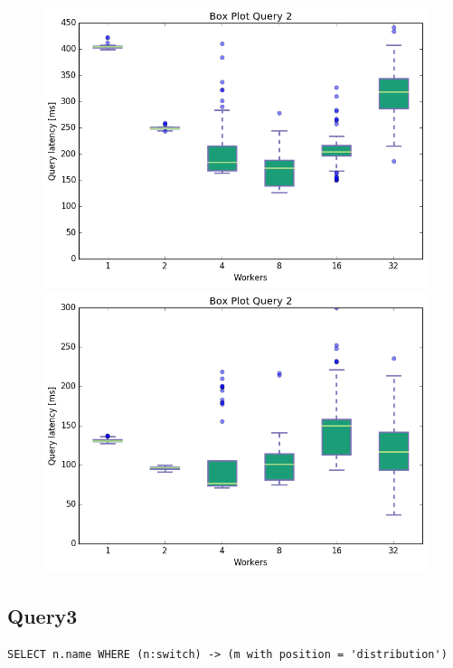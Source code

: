 \documentclass[11pt,singlecolumn]{scrartcl}
\begin{document}
\begin{figure}[!tbp]
  \centering
  \RawFloats
  \begin{minipage}[b]{0.5\textwidth}
    \includegraphics[width=\textwidth]{boxesjl/q2}
  \end{minipage}
  \hfill
  \begin{minipage}[b]{0.5\textwidth}
    \includegraphics[width=\textwidth]{boxesjs/q2}
  \end{minipage}
\end{figure}
\clearpage
\subsection{Query3}
\begin{verbatim}
SELECT n.name WHERE (n:switch) -> (m with position = 'distribution')\end{verbatim}
\end{document}
